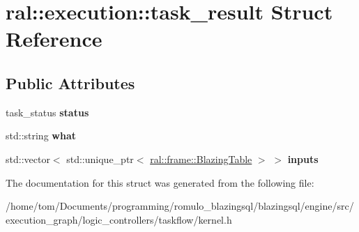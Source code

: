 \hypertarget{structral_1_1execution_1_1task__result}{}\section{ral\+:\+:execution\+:\+:task\+\_\+result Struct Reference}
\label{structral_1_1execution_1_1task__result}
\subsection*{Public Attributes}
\begin{DoxyCompactItemize}
\item 
\mbox{\label{structral_1_1execution_1_1task__result_af949df26e33aedf59f08b57a2512de30}} 
task\+\_\+status {\bfseries status}
\item 
\mbox{\label{structral_1_1execution_1_1task__result_a493f6289feaf1d2667f83c3023213bf1}} 
std\+::string {\bfseries what}
\item 
\mbox{\label{structral_1_1execution_1_1task__result_a32ed4bbfc318f1242f896959cdaf993b}} 
std\+::vector$<$ std\+::unique\+\_\+ptr$<$ \hyperlink{classral_1_1frame_1_1BlazingTable}{ral\+::frame\+::\+Blazing\+Table} $>$ $>$ {\bfseries inputs}
\end{DoxyCompactItemize}


The documentation for this struct was generated from the following file\+:\begin{DoxyCompactItemize}
\item 
/home/tom/\+Documents/programming/romulo\+\_\+blazingsql/blazingsql/engine/src/execution\+\_\+graph/logic\+\_\+controllers/taskflow/kernel.\+h\end{DoxyCompactItemize}
